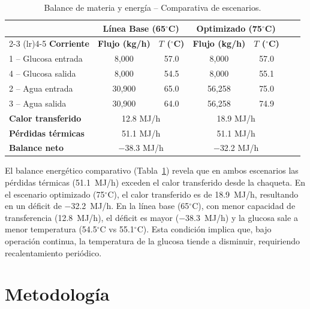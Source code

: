\documentclass[11pt,a4paper]{article}
\begin{document}
\vspace{-0.2cm}
\begin{table}[H]
\centering
\footnotesize
\caption{Balance de materia y energía -- Comparativa de escenarios.}
\label{tab:balance}
\begin{tabular}{@{}lcccccc@{}}
\toprule
& \multicolumn{2}{c}{\textbf{Línea Base (65$^\circ$C)}} & \multicolumn{2}{c}{\textbf{Optimizado (75$^\circ$C)}} \\
\cmidrule(lr){2-3} \cmidrule(lr){4-5}
\textbf{Corriente} & \textbf{Flujo (kg/h)} & \textbf{$T$ ($^\circ$C)} & \textbf{Flujo (kg/h)} & \textbf{$T$ ($^\circ$C)} \\
\midrule
1 -- Glucosa entrada & 8,000 & 57.0 & 8,000 & 57.0 \\
4 -- Glucosa salida & 8,000 & 54.5 & 8,000 & 55.1 \\
2 -- Agua entrada & 30,900 & 65.0 & 56,258 & 75.0 \\
3 -- Agua salida & 30,900 & 64.0 & 56,258 & 74.9 \\
\midrule
\textbf{Calor transferido} & \multicolumn{2}{c}{12.8 MJ/h} & \multicolumn{2}{c}{18.9 MJ/h} \\
\textbf{Pérdidas térmicas} & \multicolumn{2}{c}{51.1 MJ/h} & \multicolumn{2}{c}{51.1 MJ/h} \\
\textbf{Balance neto} & \multicolumn{2}{c}{$-$38.3 MJ/h} & \multicolumn{2}{c}{$-$32.2 MJ/h} \\
\bottomrule
\end{tabular}
\end{table}

El balance energético comparativo (Tabla~\ref{tab:balance}) revela que en ambos escenarios las pérdidas térmicas (51.1~MJ/h) exceden el calor transferido desde la chaqueta. En el escenario optimizado (75$^\circ$C), el calor transferido es de 18.9~MJ/h, resultando en un déficit de $-$32.2~MJ/h. En la línea base (65$^\circ$C), con menor capacidad de transferencia (12.8~MJ/h), el déficit es mayor ($-$38.3~MJ/h) y la glucosa sale a menor temperatura (54.5$^\circ$C vs 55.1$^\circ$C). Esta condición implica que, bajo operación continua, la temperatura de la glucosa tiende a disminuir, requiriendo recalentamiento periódico.

\section{Metodología}
\end{document}
